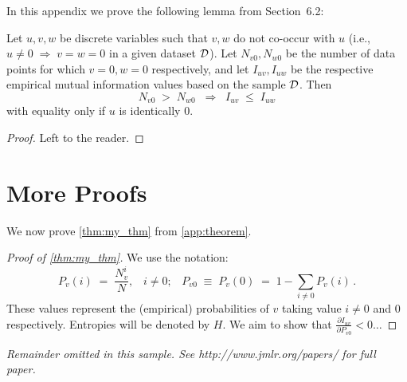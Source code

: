 \documentclass[twoside,11pt]{article}
\newcommand{\dataset}{{\cal D}}
\newcommand{\fracpartial}[2]{\frac{\partial #1}{\partial  #2}}
\begin{document}


In this appendix we prove the following lemma from
Section~6.2:

\begin{lemma}[discrete]\label{thm:my_thm}
	Let $u,v,w$ be discrete variables such that $v, w$ do
	not co-occur with $u$ (i.e., $u\neq0\;\Rightarrow \;v=w=0$ in a given
	dataset $\dataset$). Let $N_{v0},N_{w0}$ be the number of data points for
	which $v=0, w=0$ respectively, and let $I_{uv},I_{uw}$ be the
	respective empirical mutual information values based on the sample
	$\dataset$. Then
	\[
	N_{v0} \;>\; N_{w0}\;\;\Rightarrow\;\;I_{uv} \;\leq\;I_{uw}
	\]
	with equality only if $u$ is identically 0.
\end{lemma}

\begin{proof}
	Left to the reader.
\end{proof}

\section{More Proofs}
We now prove \cref{thm:my_thm} from \cref{app:theorem}.
\begin{proof}[Proof of \cref{thm:my_thm}]
	We use the notation:
	\[
	P_v(i) \;=\;\frac{N_v^i}{N},\;\;\;i \neq 0;\;\;\;
	P_{v0}\;\equiv\;P_v(0)\; = \;1 - \sum_{i\neq 0}P_v(i)\,.
	\]
	These values represent the (empirical) probabilities of $v$
	taking value $i\neq 0$ and 0 respectively.  Entropies will be denoted
	by $H$. We aim to show that $\fracpartial{I_{uv}}{P_{v0}} < 0 \ldots$
\end{proof}

{\noindent \em Remainder omitted in this sample. See http://www.jmlr.org/papers/ for full paper.}


\vskip 0.2in

\end{document}
